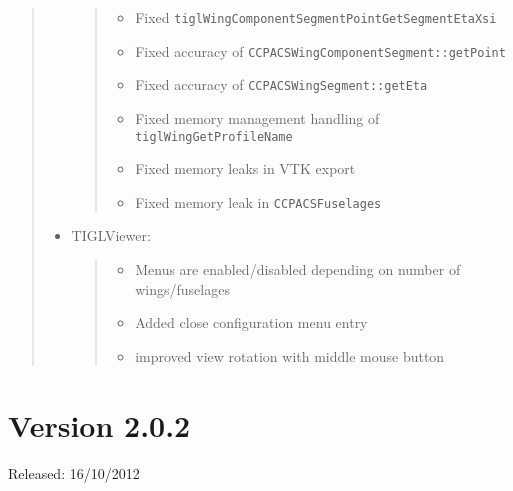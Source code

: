 \documentclass[]{scrartcl}
\begin{document}
\begin{quote}
\begin{itemize}
  \begin{quote}
  \begin{itemize}
  \itemsep1pt\parskip0pt
  \item
    Fixed \texttt{tiglWingComponentSegmentPointGetSegmentEtaXsi}
  \item
    Fixed accuracy of \texttt{CCPACSWingComponentSegment::getPoint}
  \item
    Fixed accuracy of \texttt{CCPACSWingSegment::getEta}
  \item
    Fixed memory management handling of \texttt{tiglWingGetProfileName}
  \item
    Fixed memory leaks in VTK export
  \item
    Fixed memory leak in \texttt{CCPACSFuselages}
  \end{itemize}
  \end{quote}
\item
  TIGLViewer:

  \begin{quote}
  \begin{itemize}
  \itemsep1pt\parskip0pt
  \item
    Menus are enabled/disabled depending on number of wings/fuselages
  \item
    Added close configuration menu entry
  \item
    improved view rotation with middle mouse button
  \end{itemize}
  \end{quote}
\end{itemize}
\end{quote}

\section{Version 2.0.2}\label{version-2.0.2}

Released: 16/10/2012
\end{document}
